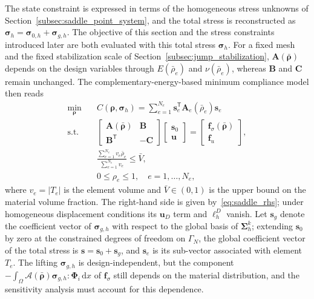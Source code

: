 The state constraint is expressed in terms of the homogeneous stress unknowns of Section~\ref{subsec:saddle_point_system}, and the total stress is reconstructed as $\boldsymbol{\sigma}_h = \boldsymbol{\sigma}_{0,h} + \boldsymbol{\sigma}_{g,h}$. The objective of this section and the stress constraints introduced later are both evaluated with this total stress $\boldsymbol{\sigma}_h$. For a fixed mesh and the fixed stabilization scale of Section~\ref{subsec:jump_stabilization}, $\boldsymbol{A}(\bar{\boldsymbol{\rho}})$ depends on the design variables through $E(\bar{\rho}_e)$ and $\nu(\bar{\rho}_e)$, whereas $\boldsymbol{B}$ and $\boldsymbol{C}$ remain unchanged. The complementary-energy-based minimum compliance model then reads
\begin{equation}
\label{eq:topopt_compliance_opt}
\begin{aligned}
\min_{\boldsymbol{\rho}} \quad & C(\boldsymbol{\rho}, \boldsymbol{\sigma}_h)
= \sum_{e=1}^{N_e} \boldsymbol{s}_e^{\mathsf T} \boldsymbol{A}_e(\bar{\rho}_e) \boldsymbol{s}_e \\
\text{s.t.} \quad &
\begin{bmatrix} \boldsymbol{A}(\bar{\boldsymbol{\rho}}) & \boldsymbol{B} \\ \boldsymbol{B}^{\mathsf T} & -\boldsymbol{C} \end{bmatrix}
\begin{bmatrix} \boldsymbol{s}_0 \\ \boldsymbol{u} \end{bmatrix}
= \begin{bmatrix} \boldsymbol{f}_\sigma(\bar{\boldsymbol{\rho}}) \\ \boldsymbol{f}_u \end{bmatrix}, \\
& \frac{\sum_{e=1}^{N_e} v_e \bar{\rho}_e}{\sum_{e=1}^{N_e} v_e} \le \bar{V}, \\
& 0 \le \rho_e \le 1, \quad e = 1, \dots, N_e,
\end{aligned}
\end{equation}
where $v_e = |T_e|$ is the element volume and $\bar{V} \in (0, 1)$ is the upper bound on the material volume fraction. The right-hand side is given by~\eqref{eq:saddle_rhs}; under homogeneous displacement conditions its $\boldsymbol{u}_D$ term and $\ell_h^D$ vanish. Let $\boldsymbol{s}_g$ denote the coefficient vector of $\boldsymbol{\sigma}_{g,h}$ with respect to the global basis of $\boldsymbol{\Sigma}_h^k$; extending $\boldsymbol{s}_0$ by zero at the constrained degrees of freedom on $\Gamma_N$, the global coefficient vector of the total stress is $\boldsymbol{s} = \boldsymbol{s}_0 + \boldsymbol{s}_g$, and $\boldsymbol{s}_e$ is its sub-vector associated with element $T_e$. The lifting $\boldsymbol{\sigma}_{g,h}$ is design-independent, but the component $-\int_\Omega \mathcal{A}(\bar{\boldsymbol{\rho}}) \boldsymbol{\sigma}_{g,h} : \boldsymbol{\Phi}_i \,\mathrm{d}x$ of $\boldsymbol{f}_\sigma$ still depends on the material distribution, and the sensitivity analysis must account for this dependence.

